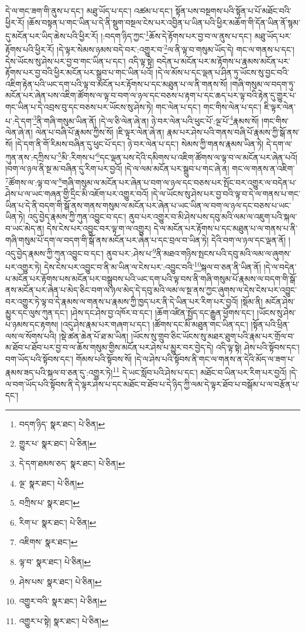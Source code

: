 དེ་ལ་གང་ཟག་གི་ནུས་པ་དང་། མཐུ་ཡོད་པ་དང་། འཚམ་པ་དང་། སྟོན་པས་བསྔགས་པའི་སྟོན་པ་པོ་མཐོང་བའི་ཕྱིར་རོ། །ཆོས་བསྟན་པ་གང་ཡིན་པ་དེ་ནི་སྡུག་བསྔལ་ངེས་པར་འབྱིན་པ་ཡིན་པའི་ཕྱིར་མཆོག་གི་དོན་ཡིན་ནོ་སྙམ་དུ་མངོན་པར་ཡིད་ཆེས་པའི་ཕྱིར་རོ། །:བདག་ཉིད་ཀྱང་\footnote{བདག་ཉིད་  སྣར་ཐང་།  པེ་ཅིན། }ཆོས་དེ་རྟོགས་པར་བྱ་བ་ལ་ནུས་པ་དང་། མཐུ་ཡོད་པར་རྟོགས་པའི་ཕྱིར་རོ། །དེ་ལྟར་སེམས་ཉམས་བདེ་བར་:འགྱུར་བ་\footnote{གྱུར་པ་  སྣར་ཐང་།  པེ་ཅིན། }ལ་ནི་ལྟ་བ་གསུམ་ཡོད་དེ། གང་ལ་གནས་པ་དང་། དེས་ཡོངས་སུ་ཤེས་པར་བྱ་བ་གང་ཡིན་པ་དང་། འདི་ལྟ་སྟེ། བདེན་པ་མངོན་པར་མ་རྟོགས་པ་རྣམས་མངོན་པར་རྟོགས་པར་བྱ་བའི་ཕྱིར་མངོན་པར་སྒྲུབ་པ་གང་ཡིན་པའོ། །དེ་ལ་མོས་པ་དང་ལྡན་པ་ཤིན་ཏུ་ཡོངས་སུ་བྱང་བའི་འཇིག་རྟེན་པའི་ཡང་དག་པའི་ལྟ་བ་མངོན་པར་རྟོགས་པ་དང་མཐུན་པ་ལ་ནི་གནས་སོ། །གཞི་གསུམ་ལ་བདག་ཏུ་མངོན་པར་ཞེན་པས་འཇིག་ཚོགས་ལ་ལྟ་བ་བག་ལ་ཉལ་དང་བཅས་པ་རྟག་པ་དང་ཆད་པར་ལྟ་བའི་རྟེན་དུ་གྱུར་པ་གང་ཡིན་པ་དེ་འབྲས་བུ་དང་བཅས་པར་ཡོངས་སུ་ཤེས་ཏེ། གང་ལེན་པ་དང་། གང་གིས་ལེན་པ་དང་། ཇི་ལྟར་ལེན་པ་:དེ་དག་\footnote{དེ་དག་ཐམས་ཅད་  སྣར་ཐང་།  པེ་ཅིན། }ནི་གཞི་གསུམ་ཡིན་ནོ། །དེ་ལ་ཅི་ལེན་ཞེ་ན། ཉེ་བར་ལེན་པའི་ཕུང་པོ་:ལྔ་པོ་\footnote{ལྔ་  སྣར་ཐང་།  པེ་ཅིན། }རྣམས་སོ། །གང་གིས་ལེན་ཞེ་ན། ལེན་པ་བཞི་པོ་རྣམས་ཀྱིས་སོ། །ཇི་ལྟར་ལེན་ཞེ་ན། རྣམ་པར་ཤེས་པའི་གནས་བཞི་པོ་རྣམས་ཀྱི་སྒོ་ནས་སོ། །དེ་དག་ནི་གོ་རིམས་བཞིན་དུ་ཕུང་པོ་དང་། ཉེ་བར་ལེན་པ་དང་། སེམས་ཀྱི་གནས་རྣམས་ཡིན་ཏེ། དེ་དག་ལ་ཀུན་ནས་:དཀྲིས་པ་\footnote{བཀྲིས་པ་  སྣར་ཐང་། }མི་:རིགས་པ་\footnote{རིག་པ་  སྣར་ཐང་།  པེ་ཅིན། }དང་ལྡན་པས་དེའི་དམིགས་པ་འཇིག་ཚོགས་ལ་ལྟ་བ་ལ་མངོན་པར་ཞེན་པའོ། །བག་ལ་ཉལ་ནི་སྔ་མ་བཞིན་དུ་རིག་པར་བྱའོ། །དེ་ལ་ལམ་མངོན་པར་སྒྲུབ་པ་གང་ཞེ་ན། གང་ལ་གནས་ན་འཇིག་\footnote{འཇིགས་  སྣར་ཐང་། }ཚོགས་ལ་:ལྟ་བ་ལ་\footnote{ལྟ་བ་  སྣར་ཐང་།  པེ་ཅིན། }གཞི་གསུམ་ལ་མངོན་པར་ཞེན་པ་བག་ལ་ཉལ་དང་བཅས་པར་སྤོང་བར་འགྱུར་ལ་བདེན་པ་ཤེས་པ་ལ་ཡང་གཞན་གྱི་དྲིང་མི་འཇོག་པར་འགྱུར་བའོ། །དེ་ལ་ཡོངས་སུ་ཤེས་པར་བྱ་བའི་ལྟ་བ་དེ་ལ་གནས་པ་གང་ཡིན་པ་དེ་ནི་བདག་གི་སྒོ་ནས་གནས་གསུམ་ལ་མངོན་པར་ཞེན་པ་ཡང་ཡིན་ལ་བག་ལ་ཉལ་དང་བཅས་པ་ཡང་ཡིན་ཏེ། འདུ་བྱེད་རྣམས་ཀྱི་ཀུན་འབྱུང་བ་དང་། ནུབ་པར་འགྱུར་བ་མི་ཤེས་པས་དབུ་མའི་ལམ་ལ་འཇུག་པའི་སྐལ་བ་ཡང་མེད་ན། དེས་ངེས་པར་འབྱུང་བར་ལྟ་ག་ལ་འགྱུར། དེ་ལ་མངོན་པར་རྟོགས་པ་དང་མཐུན་པ་ལ་གནས་པ་ནི་གཞི་གསུམ་པོ་དག་ལ་བདག་གི་སྒོ་ནས་མངོན་པར་ཞེན་པ་དང་བྲལ་བ་ཡིན་ཏེ། དེའི་བག་ལ་ཉལ་དང་ལྡན་ནོ། །འདུ་བྱེད་རྣམས་ཀྱི་ཀུན་འབྱུང་བ་དང་། ནུབ་པར་:ཤེས་པ་\footnote{ཤེས་པས་  སྣར་ཐང་།  པེ་ཅིན། }ནི་མཐའ་གཉིས་སྤངས་པའི་དབུ་མའི་ལམ་ལ་ཞུགས་པར་འགྱུར་ཏེ། དེས་ངེས་པར་འབྱུང་བ་ནི་མ་ཡིན་ལ་ངེས་པར་:འབྱུང་བའི་\footnote{འགྱུར་བའི་  སྣར་ཐང་།  པེ་ཅིན། }སྐལ་བ་ཅན་ནི་ཡིན་ནོ། །དེ་ལ་བདེན་པ་མངོན་པར་རྟོགས་པས་མངོན་པར་བསྒྲུབས་པའི་ཡང་དག་པའི་ལྟ་བས་ནི་གཞི་གསུམ་པོ་རྣམས་ལ་བདག་གི་སྒོ་ནས་མངོན་པར་ཞེན་པ་མེད་ཅིང་བག་ལ་ཉལ་མེད་དེ་དབུ་མའི་ལམ་ལ་སྔ་ནས་ཀྱང་ཞུགས་ལ་དེས་ངེས་པར་འབྱུང་བར་འགྱུར་ཏེ་ལྟ་བ་དེ་རྣམས་ལ་གནས་པ་རྣམས་ཀྱི་ཁྱད་པར་ནི་དེ་ཡིན་པར་རིག་པར་བྱའོ། །སྡོམ་ནི། མངོན་ཤེས་མྱུར་དང་ལུས་ཀུན་དང་། །ཤེས་དང་ཤེས་བྱ་འཁོར་བ་དང་། །ཆོག་འཛིན་སྤྱོད་དང་རྒྱུན་ཕྱོགས་དང་། །ཡོངས་སུ་ཤེས་པ་ཉམས་དང་རྟགས། །འདུ་ཤེས་རྣམ་པར་གཞག་པ་དང་། །ཚོགས་དང་མི་མཐུན་གང་ཡིན་དང་། །སྟོན་པའི་ཕྲིན་ལས་ལ་སོགས་པའི། །སྡེ་ཚན་ཆེན་པོ་ཐ་མ་ཡིན། །ཡོངས་སུ་གྲུབ་ཅིང་ཡོངས་སུ་མཐར་ཐུག་པའི་རྣམ་པར་གྲོལ་བ་མ་ཐོབ་པ་ཐོབ་པར་བྱ་བ་ལ་ཆོས་གསུམ་གྱིས་མངོན་པར་ཤེས་པ་མྱུར་བར་བྱེད་དེ། འདི་ལྟ་སྟེ། ཤེས་པའི་སྟོབས་དང་། བག་ཡོད་པའི་སྟོབས་དང་། གོམས་པའི་སྟོབས་སོ། །དེ་ལ་ཤེས་པའི་སྟོབས་ནི་གང་ལ་གནས་ན་དེའི་མོད་ལ་ཟག་པ་རྣམས་ཟད་པའི་སྐལ་བ་ཅན་དུ་:འགྱུར་ཏེ།\footnote{འགྱུར་པ་སྟེ།  སྣར་ཐང་།  པེ་ཅིན། } དེ་ཡང་སློབ་པའི་ཤེས་པ་དང་། མཐོང་བ་ཡིན་པར་རིག་པར་བྱའོ། །དེ་ལ་བག་ཡོད་པའི་སྟོབས་ནི་དེ་ལྟར་ཤེས་པ་དང་མཐོང་བ་ཐོབ་པ་དེ་ཉིད་ཀྱི་ལམ་དེ་ལྟར་ཐོབ་པ་བསྒོམ་པ་ལ་བརྩོན་པ་དང་། 